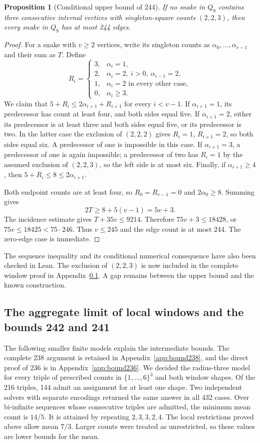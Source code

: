 \documentclass[11pt,a4paper]{article}
\newtheorem{proposition}[theorem]{Proposition}
\theoremstyle{definition}
\theoremstyle{remark}
\newcommand{\Q}{Q}
\begin{document}
\begin{proposition}[Conditional upper bound of 244]\label{prop:conditional244}
If no snake in $\Q_9$ contains three consecutive internal vertices with singleton-square counts $(2,2,3)$, then every snake in $\Q_9$ has at most 244 edges.
\end{proposition}
\begin{proof}
For a snake with $v\ge2$ vertices, write its singleton counts as $\alpha_0,\ldots,\alpha_{v-1}$ and their sum as $T$. Define
\[
R_i=\begin{cases}
3,&\alpha_i=1,\\
2,&\alpha_i=2,\ i>0,\ \alpha_{i-1}=2,\\
1,&\alpha_i=2\text{ in every other case},\\
0,&\alpha_i\ge3.
\end{cases}
\]
We claim that $5+R_i\le2\alpha_{i+1}+R_{i+1}$ for every $i<v-1$. If $\alpha_{i+1}=1$, its predecessor has count at least four, and both sides equal five. If $\alpha_{i+1}=2$, either its predecessor is at least three and both sides equal five, or its predecessor is two. In the latter case the exclusion of $(2,2,2)$ gives $R_i=1$, $R_{i+1}=2$, so both sides equal six. A predecessor of one is impossible in this case. If $\alpha_{i+1}=3$, a predecessor of one is again impossible; a predecessor of two has $R_i=1$ by the assumed exclusion of $(2,2,3)$, so the left side is at most six. Finally, if $\alpha_{i+1}\ge4$, then $5+R_i\le8\le2\alpha_{i+1}$.

Both endpoint counts are at least four, so $R_0=R_{v-1}=0$ and $2\alpha_0\ge8$. Summing gives
\[
2T\ge8+5(v-1)=5v+3.
\]
The incidence estimate gives $T+35v\le9214$. Therefore $75v+3\le18428$, or $75v\le18425<75\cdot246$. Thus $v\le245$ and the edge count is at most 244. The zero-edge case is immediate.
\end{proof}

The sequence inequality and its conditional numerical consequence have also been checked in Lean. The exclusion of $(2,2,3)$ is now included in the complete window proof in Appendix~\ref{sec:window-aggregate}. A gap remains between the upper bound and the known construction.

\subsection{The aggregate limit of local windows and the bounds 242 and 241}\label{sec:window-aggregate}
The following smaller finite models explain the intermediate bounds. The complete 238 argument is retained in Appendix~\ref{app:bound238}, and the direct proof of 236 is in Appendix~\ref{app:bound236}. We decided the radius-three model for every triple of prescribed counts in $\{1,\ldots,6\}^3$ and both window shapes. Of the 216 triples, 144 admit an assignment for at least one shape. Two independent solvers with separate encodings returned the same answer in all 432 cases. Over bi-infinite sequences whose consecutive triples are admitted, the minimum mean count is $14/5$. It is attained by repeating $2,3,3,2,4$. The local restrictions proved above allow mean $7/3$. Larger counts were treated as unrestricted, so these values are lower bounds for the mean.
\end{document}
